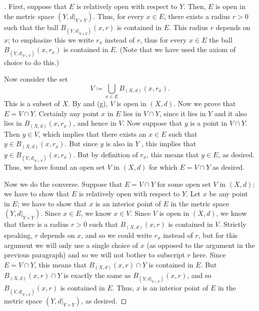 \begin{proof}[]
  First, suppose that \(E\) is relatively open with respect to \(Y\).
  Then, \(E\) is open in the metric space \((Y, d|_{Y \times Y})\).
  Thus, for every \(x \in E\), there exists a radius \(r > 0\) such that the ball \(B_{(Y, d|_{Y \times Y})}(x, r)\) is contained in \(E\).
  This radius \(r\) depends on \(x\);
  to emphasize this we write \(r_x\) instead of \(r\), thus for every \(x \in E\) the ball \(B_{(Y, d|_{Y \times Y})}(x, r_x)\) is contained in \(E\).
  (Note that we have used the axiom of choice to do this.)

  Now consider the set
  \[
    V \coloneqq \bigcup_{x \in E} B_{(X, d)}(x, r_x).
  \]
  This is a subset of \(X\).
  By  and (g), \(V\) is open in \((X, d)\).
  Now we prove that \(E = V \cap Y\).
  Certainly any point \(x\) in \(E\) lies in \(V \cap Y\), since it lies in \(Y\) and it also lies in \(B_{(X, d)}(x, r_x)\), and hence in \(V\).
  Now suppose that \(y\) is a point in \(V \cap Y\).
  Then \(y \in V\), which implies that there exists an \(x \in E\) such that \(y \in B_{(X, d)}(x, r_x)\).
  But since \(y\) is also in \(Y\) , this implies that \(y \in B_{(Y, d|_{Y \times Y})}(x, r_x)\).
  But by definition of \(r_x\), this means that \(y \in E\), as desired.
  Thus, we have found an open set \(V\) in \((X, d)\) for which \(E = V \cap Y\) as desired.

  Now we do the converse.
  Suppose that \(E = V \cap Y\) for some open set \(V\) in \((X, d)\);
  we have to show that \(E\) is relatively open with respect to \(Y\).
  Let \(x\) be any point in \(E\);
  we have to show that \(x\) is an interior point of \(E\) in the metric space \((Y, d|_{Y \times Y})\).
  Since \(x \in E\), we know \(x \in V\).
  Since \(V\) is open in \((X, d)\), we know that there is a radius \(r > 0\) such that \(B_{(X, d)}(x, r)\) is contained in \(V\).
  Strictly speaking, \(r\) depends on \(x\), and so we could write \(r_x\) instead of \(r\), but for this argument we will only use a single choice of \(x\) (as opposed to the argument in the previous paragraph) and so we will not bother to subscript \(r\) here.
  Since \(E = V \cap Y\), this means that \(B_{(X, d)}(x, r) \cap Y\) is contained in \(E\).
  But \(B_{(X, d)}(x, r) \cap Y\) is exactly the same as \(B_{(Y, d|_{Y \times Y})}(x, r)\), and so \(B_{(Y, d|_{Y \times Y})}(x, r)\) is contained in \(E\).
  Thus, \(x\) is an interior point of \(E\) in the metric space \((Y, d|_{Y \times Y})\), as desired.
\end{proof}

